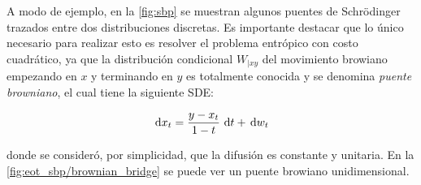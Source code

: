 A modo de ejemplo, en la \autoref{fig:sbp} se muestran algunos puentes de Schrödinger trazados entre dos distribuciones discretas. Es importante destacar que lo único necesario para realizar esto es resolver el problema entrópico con costo cuadrático, ya que la distribución condicional $W_{|xy}$ del movimiento browiano empezando en $x$ y terminando en $y$ es totalmente conocida y se denomina \textit{puente browniano}, el cual tiene la siguiente SDE:

\begin{equation*}
	\,\operatorname{d}\! x_t = \frac{y-x_t}{1-t} \,\operatorname{d}\! t + \,\operatorname{d}\! w_t
\end{equation*}

donde se consideró, por simplicidad, que la difusión es constante y unitaria. En la \autoref{fig:eot_sbp/brownian_bridge} se puede ver un puente browiano unidimensional.


